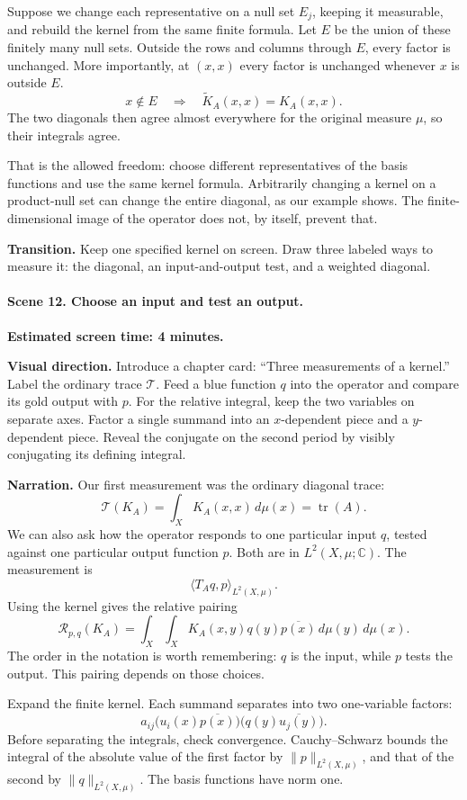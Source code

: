 Suppose we change each representative on a null set $E_j$, keeping it measurable, and rebuild the kernel from the same finite formula. Let $E$ be the union of these finitely many null sets. Outside the rows and columns through $E$, every factor is unchanged. More importantly, at $(x,x)$ every factor is unchanged whenever $x$ is outside $E$.
\[
x\notin E\quad\Longrightarrow\quad
\widetilde K_A(x,x)=K_A(x,x).
\]
The two diagonals then agree almost everywhere for the original measure $\mu$, so their integrals agree.

That is the allowed freedom: choose different representatives of the basis functions and use the same kernel formula. Arbitrarily changing a kernel on a product-null set can change the entire diagonal, as our example shows. The finite-dimensional image of the operator does not, by itself, prevent that.

\textbf{Transition.} Keep one specified kernel on screen. Draw three labeled ways to measure it: the diagonal, an input-and-output test, and a weighted diagonal.

\paragraph{Scene 12. Choose an input and test an output.}
\textbf{Estimated screen time: 4 minutes.}

\textbf{Visual direction.} Introduce a chapter card: ``Three measurements of a kernel.'' Label the ordinary trace $\mathcal T$. Feed a blue function $q$ into the operator and compare its gold output with $p$. For the relative integral, keep the two variables on separate axes. Factor a single summand into an $x$-dependent piece and a $y$-dependent piece. Reveal the conjugate on the second period by visibly conjugating its defining integral.

\textbf{Narration.} Our first measurement was the ordinary diagonal trace:
\[
\mathcal T(K_A)=\int_XK_A(x,x)\,d\mu(x)=\operatorname{tr}(A).
\]
We can also ask how the operator responds to one particular input $q$, tested against one particular output function $p$. Both are in $L^2(X,\mu;\mathbb C)$. The measurement is
\[
\langle T_Aq,p\rangle_{L^2(X,\mu)}.
\]
Using the kernel gives the relative pairing
\[
\mathcal R_{p,q}(K_A)
=\int_X\int_XK_A(x,y)q(y)\overline{p(x)}\,d\mu(y)\,d\mu(x).
\]
The order in the notation is worth remembering: $q$ is the input, while $p$ tests the output. This pairing depends on those choices.

Expand the finite kernel. Each summand separates into two one-variable factors:
\[
a_{ij}\bigl(u_i(x)\overline{p(x)}\bigr)
\bigl(q(y)\overline{u_j(y)}\bigr).
\]
Before separating the integrals, check convergence. Cauchy--Schwarz bounds the integral of the absolute value of the first factor by $\|p\|_{L^2(X,\mu)}$, and that of the second by $\|q\|_{L^2(X,\mu)}$. The basis functions have norm one.

